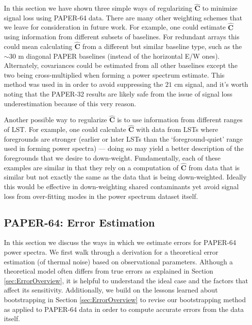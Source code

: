 \documentclass[preprint2,numberedappendix,tighten]{aastex6}  %
\begin{document}
In this section we have shown three simple ways of regularizing $\hat{\textbf{C}}$ to minimize signal loss using PAPER-64 data. There are many other weighting schemes that we leave for consideration in future work. For example, one could estimate $\hat{\textbf{C}}$ using information from different subsets of baselines. For redundant arrays this could mean calculating $\hat{\textbf{C}}$ from a different but similar baseline type, such as the $\sim30$ m diagonal PAPER baselines (instead of the horizontal E/W ones). Alternately, covariances could be estimated from all other baselines except the two being cross-multiplied when forming a power spectrum estimate. This method was used in \citet{parsons_et_al2014} in order to avoid suppressing the $21$ cm signal, and it's worth noting that the PAPER-32 results are likely safe from the issue of signal loss underestimation because of this very reason.

Another possible way to regularize $\hat{\textbf{C}}$ is to use information from different ranges of LST. For example, one could calculate $\hat{\textbf{C}}$ with data from LSTs where foregrounds are stronger (earlier or later LSTs than the `foreground-quiet' range used in forming power spectra) --- doing so may yield a better description of the foregrounds that we desire to down-weight. Fundamentally, each of these examples are similar in that they rely on a computation of $\hat{\textbf{C}}$ from data that is similar but not exactly the same as the data that is being down-weighted. Ideally this would be effective in down-weighting shared contaminants yet avoid signal loss from over-fitting modes in the power spectrum dataset itself. 


\subsection{PAPER-64: Error Estimation}
\label{sec:Error}

In this section we discuss the ways in which we estimate errors for PAPER-64 power spectra. We first walk through a derivation for a theoretical error estimation (of thermal noise) based on observational parameters. Although a theoretical model often differs from true errors as explained in Section \ref{sec:ErrorOverview}, it is helpful to understand the ideal case and the factors that affect its sensitivity. Additionally, we build on the lessons learned about bootstrapping in Section \ref{sec:ErrorOverview} to revise our bootstrapping method as applied to PAPER-64 data in order to compute accurate errors from the data itself.
\end{document}
